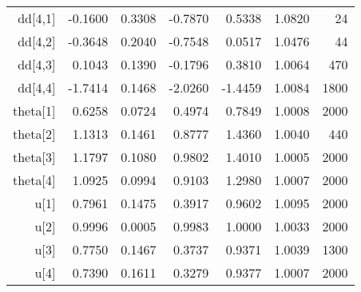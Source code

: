 \begin{table}[ht]
\begin{tabular}{rrrrrrr}
  dd[4,1] & -0.1600 & 0.3308 & -0.7870 & 0.5338 & 1.0820 &    24 \\ 
  dd[4,2] & -0.3648 & 0.2040 & -0.7548 & 0.0517 & 1.0476 &    44 \\ 
  dd[4,3] & 0.1043 & 0.1390 & -0.1796 & 0.3810 & 1.0064 &   470 \\ 
  dd[4,4] & -1.7414 & 0.1468 & -2.0260 & -1.4459 & 1.0084 &  1800 \\ 
  theta[1] & 0.6258 & 0.0724 & 0.4974 & 0.7849 & 1.0008 &  2000 \\ 
  theta[2] & 1.1313 & 0.1461 & 0.8777 & 1.4360 & 1.0040 &   440 \\ 
  theta[3] & 1.1797 & 0.1080 & 0.9802 & 1.4010 & 1.0005 &  2000 \\ 
  theta[4] & 1.0925 & 0.0994 & 0.9103 & 1.2980 & 1.0007 &  2000 \\ 
  u[1] & 0.7961 & 0.1475 & 0.3917 & 0.9602 & 1.0095 &  2000 \\ 
  u[2] & 0.9996 & 0.0005 & 0.9983 & 1.0000 & 1.0033 &  2000 \\ 
  u[3] & 0.7750 & 0.1467 & 0.3737 & 0.9371 & 1.0039 &  1300 \\ 
  u[4] & 0.7390 & 0.1611 & 0.3279 & 0.9377 & 1.0007 &  2000 \\ 
   \hline
\end{tabular}
\end{table}
